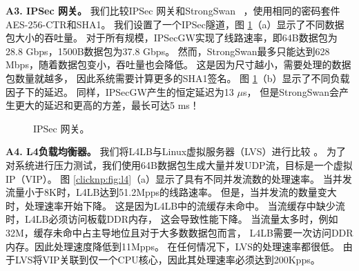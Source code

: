 \textbf {A3. IPSec 网关。}
我们比较IPSec 网关和StrongSwan~ \cite {strongswan}，使用相同的密码套件AES-256-CTR和SHA1。
我们设置了一个IPSec隧道，图 \ref {clicknp:fig:IPSec}（a）显示了不同数据包大小的吞吐量。
对于所有规模，IPSecGW实现了线路速率，即64B数据包为28.8 Gbps，1500B数据包为37.8 Gbps。
然而，StrongSwan最多只能达到628 Mbps，随着数据包变小，吞吐量也会降低。
这是因为尺寸越小，需要处理的数据包数量就越多，
因此系统需要计算更多的SHA1签名。
图 \ref {clicknp:fig:IPSec}（b）显示了不同负载因子下的延迟。 同样，IPSecGW产生的恒定延迟为13 $\mu$s，
但是StrongSwan会产生更大的延迟和更高的方差，最长可达5 ms！



\begin{figure}[htbp]
	\centering
	
	\caption{IPSec 网关。}
	
	\label{clicknp:fig:IPSec}
\end{figure}


\textbf {A4. L4负载均衡器。}
我们将L4LB与Linux虚拟服务器（LVS）进行比较 \cite {lvs}。
为了对系统进行压力测试，我们使用64B数据包生成大量并发UDP流，目标是一个虚拟IP（VIP）。
图 \ref {clicknp:fig:l4}（a）显示了具有不同并发流数的处理速率。
当并发流量小于8K时，L4LB达到51.2Mpps的线路速率。
但是，当并发流的数量变大时，处理速率开始下降。
这是因为L4LB中的流缓存未命中。
当流缓存中缺少流时，L4LB必须访问板载DDR内存，
这会导致性能下降。
当流量太多时，例如32M，缓存未命中占主导地位且对于大多数数据包而言，
L4LB需要一次访问DDR内存。因此处理速度降低到11Mpps。
在任何情况下，LVS的处理速率都很低。
由于LVS将VIP关联到仅一个CPU核心，因此其处理速率必须达到200Kpps。

